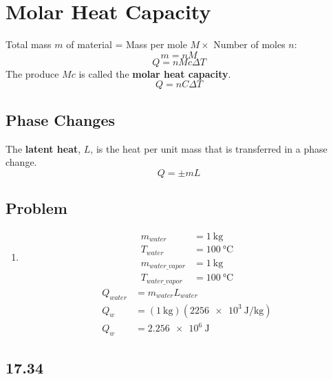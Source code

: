 \documentclass{article}
\begin{document}
\section{Molar Heat Capacity}

Total mass $ m $ of material = Mass per mole $ M \times $ Number of moles $ n $:
\begin{equation}
	m = nM
\end{equation}
\begin{equation}
	Q = nMc\Delta T
\end{equation}
The produce $ Mc $ is called the \textbf{molar heat capacity}.
\begin{equation}
	Q = nC\Delta T
\end{equation}

\subsection{Phase Changes}

The \textbf{latent heat}, $ L $, is the heat per unit mass that is transferred in a phase change.
\begin{equation}
	Q = \pm mL
\end{equation}

\subsection{Problem}

\begin{enumerate}[label = \boldalph]
	\item
		\begin{align*}
			m_{water} & = \SI{1}{\kilogram} \\
			T_{water} & = \SI{100}{\celsius} \\
			m_{water\_vapor} & = \SI{1}{\kilogram} \\
			T_{water\_vapor} & = \SI{100}{\celsius}
		\end{align*}
		\begin{align*}
			Q_{water} & = m_{water}L_{water} \\
			Q_{w} & = (\SI{1}{\kilogram})(\SI{2256e3}{\joule \per \kilogram}) \\
			Q_{w} & = \SI{2.256e6}{\joule}
		\end{align*}
\end{enumerate}

\subsection{17.34}
\end{document}
